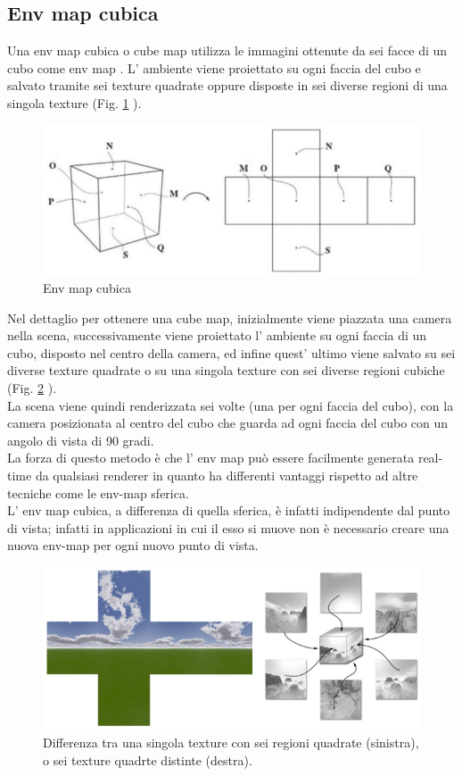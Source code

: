 \subsection{Env map cubica}
\label{sec:chapter_stato_arte_envmap_cubica}

Una env map cubica o cube map utilizza le immagini ottenute da sei facce di un cubo come env map \cite{env3} . 
L’ ambiente viene proiettato su ogni faccia del cubo e salvato tramite sei texture quadrate oppure disposte in sei diverse regioni di una singola texture (Fig. \ref{fig:stato_arte_cubo_envmap} ).
\begin{figure}[htb]
 \centering
 \includegraphics[width=0.6\linewidth]{images/chapter_stato_arte/stato_arte_cubo_envmap.png}\hfill
 \caption[Env map cubica]{Env map cubica}
 \label{fig:stato_arte_cubo_envmap}
\end{figure}
Nel dettaglio per ottenere una cube map, inizialmente viene piazzata una camera nella scena, successivamente viene proiettato l’ ambiente su ogni faccia di un cubo, disposto nel centro della camera, ed infine quest’ ultimo viene salvato su sei diverse texture quadrate o su una singola texture con sei diverse regioni cubiche (Fig. \ref{fig:stato_arte_texture_env_cubo} ).
\\
La scena viene quindi renderizzata sei volte (una per ogni faccia del cubo), con la camera posizionata al centro del cubo che guarda ad ogni faccia del cubo con un angolo di vista di 90 gradi.
\\
La forza di questo metodo è che l’ env map può essere facilmente generata real-time da qualsiasi renderer in quanto ha differenti vantaggi rispetto ad altre tecniche come le env-map sferica.
\\
L’ env map cubica, a differenza di quella sferica, è infatti indipendente dal punto di vista; infatti in applicazioni in cui il esso si muove non è necessario creare una nuova env-map per ogni nuovo punto di vista.
\begin{figure}[htb]
 \centering
 \includegraphics[width=0.9\linewidth]{images/chapter_stato_arte/stato_arte_texture_env_cubo.png}\hfill
 \caption[Env map texture]{Differenza tra una singola texture con sei regioni quadrate (sinistra), o sei texture quadrte distinte (destra).}
 \label{fig:stato_arte_texture_env_cubo}
\end{figure}